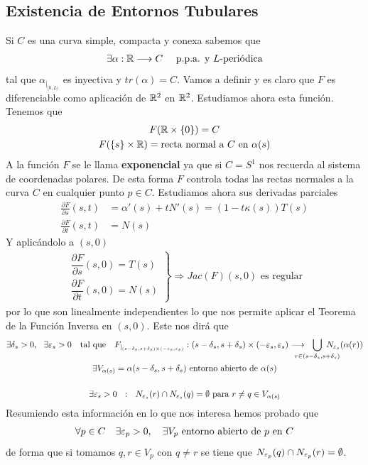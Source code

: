 \subsection{Existencia de Entornos Tubulares}
Si $C$ es una curva simple, compacta y conexa sabemos que 
\begin{gather*}
    \exists \alpha : \mathbb{R} \longrightarrow C \quad \text{ p.p.a. y $L$-periódica}
\end{gather*}
tal que $\alpha_{|_{[0,L)}}$ es inyectiva y $tr(\alpha)=C$. Vamos a definir 
y es claro que $F$ es diferenciable como aplicación de $\mathbb{R}^2$ en $\mathbb{R}^2$. Estudiamos ahora esta función.
Tenemos que 
\begin{gather*}
    F(\mathbb{R}\times \{0\}) = C\\
    F(\{s\} \times \mathbb{R}) = \text{recta normal a $C$ en $\alpha(s)$}
\end{gather*}
A la función $F$ se le llama \textbf{exponencial} ya que si $C=S^1$ nos recuerda al sistema de coordenadas polares. De esta forma $F$ controla todas las rectas normales a la curva $C$ en cualquier punto $p\in C$. Estudiamos ahora sus derivadas parciales
\begin{align*}
    \frac{\partial F}{\partial s}(s,t) &= \alpha'(s) + tN'(s) = (1-t\kappa(s)) T(s)\\[1.5em]
    \frac{\partial F}{\partial t}(s,t) &= N(s)
\end{align*}
Y aplicándolo a $(s,0)$
\begin{align*}
    \left.
        \begin{array}{c}
            \dfrac{\partial F}{\partial s}(s,0) = T(s)\\[1.5em]
            \dfrac{\partial F}{\partial t}(s,0) = N(s)
        \end{array}
    \right\} \Rightarrow Jac(F)(s,0) \text{ es regular}
\end{align*}
por lo que son linealmente independientes lo que nos permite aplicar el Teorema de la Función Inversa en $(s,0)$. Este nos dirá que 
\begin{gather*}
    \exists \delta_s >0 , \ \ \exists \veps_s > 0 \ \ \text{ tal que } \ \ F_{|_{(s-\delta_s, s+\delta_s) \times (-\veps_s, \veps_s)}} : (s-\delta_s, s+\delta_s) \times (-\veps_s, \veps_s) \longrightarrow \ \ \bigcup_{\mathclap{r\in(s-\delta_s, s+\delta_s)}}\ N_{\veps_s}(\alpha(r))\\
    \exists V_{\alpha(s)} = \alpha(s-\delta_s, s+\delta_s) \text{ entorno abierto de $\alpha(s)$} \\[1.5em]
    \exists \veps_s > 0 \ \ : \ \ N_{\veps_s}(r)\cap N_{\veps_s}(q) = \emptyset \text{ para } r\neq q \in V_{\alpha(s)}
\end{gather*}
Resumiendo esta información en lo que nos interesa hemos probado que 
\begin{gather*}
    \forall p \in C \quad \exists \varepsilon_p > 0, \quad \exists V_p \text{ entorno abierto de $p$ en $C$}
\end{gather*}
de forma que si tomamos $q,r\in V_p$ con $q\neq r$ se tiene que $N_{\varepsilon_p}(q)\cap N_{\varepsilon_p}(r)=\emptyset$.\\


